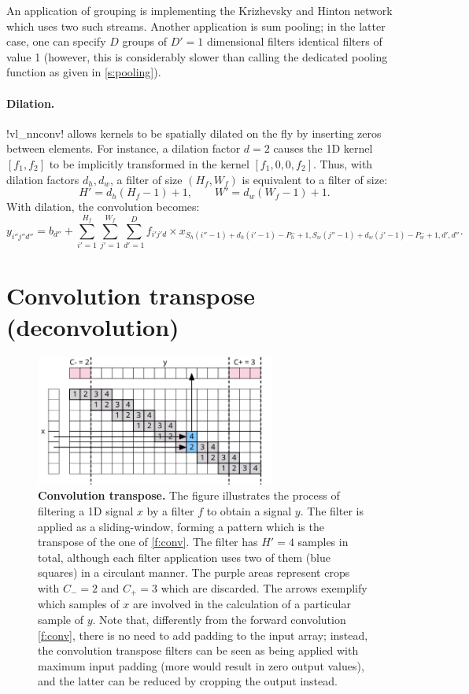 An application of grouping is implementing the Krizhevsky and Hinton network~\cite{krizhevsky12imagenet} which uses two such streams. Another application is sum pooling; in the latter case, one can specify $D$ groups of $D'=1$ dimensional filters identical filters of value 1 (however, this is considerably slower than calling the dedicated pooling function as given in \cref{s:pooling}).

\paragraph{Dilation.} !vl_nnconv! allows kernels to be spatially dilated on the fly by inserting zeros between elements. For instance, a dilation factor $d=2$ causes the 1D kernel $[f_1,f_2]$ to be implicitly transformed in the kernel $[f_1,0,0,f_2]$. Thus, with dilation factors $d_h,d_w$, a filter of size $(H_f,W_f)$ is equivalent to a filter of size:
\[
  H' = d_h(H_f - 1) + 1,
  \qquad
  W' = d_w(W_f - 1) + 1.
\]
With dilation, the convolution becomes:
\[
y_{i''j''d''}
=
b_{d''}
+
\sum_{i'=1}^{H_f}
\sum_{j'=1}^{W_f}
\sum_{d'=1}^D
f_{i'j'd} \times x_{
S_h (i''-1)+d_h(i'-1)-P_h^-+1,
S_w (j''-1)+d_w(j'-1)-P_w^-+1,
d',d''}.
\]


\section{Convolution transpose (deconvolution)}\label{s:convt}

\begin{figure}[t]
	\centering
	\includegraphics[width=0.7\textwidth]{figures/svg/convt}
	\caption{\textbf{Convolution transpose.} The figure illustrates the process of filtering a 1D signal $x$ by a filter $f$ to obtain a signal $y$. The filter is applied as a sliding-window, forming a pattern which is the transpose of the one of \cref{f:conv}. The filter has $H'=4$ samples in total, although each filter application uses two of them (blue squares) in a circulant manner. The purple areas represent crops with $C_-=2$ and $C_+=3$ which are discarded. The arrows exemplify which samples of $x$ are involved in the calculation of a particular sample of $y$. Note that, differently from the forward convolution \cref{f:conv}, there is no need to add padding to the input array; instead, the convolution transpose filters can be seen as being applied with maximum input padding (more would result in zero output values), and the latter can be reduced by cropping the output instead.}\label{f:convt}
\end{figure}

